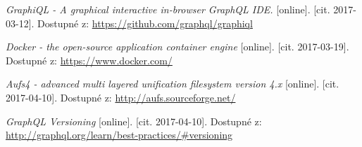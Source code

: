 \begin{thebibliography}{99}
\textit{GraphiQL - A graphical interactive in-browser GraphQL IDE.} [online]. [cit. 2017-03-12]. Dostupné z: \url{https://github.com/graphql/graphiql}

\textit{Docker - the open-source application container engine} [online]. [cit. 2017-03-19]. Dostupné z: \url{https://www.docker.com/}

\textit{Aufs4 - advanced multi layered unification filesystem version 4.x} [online]. [cit. 2017-04-10]. Dostupné z: \url{http://aufs.sourceforge.net/}

\textit{GraphQL Versioning} [online]. [cit. 2017-04-10]. Dostupné z: \url{http://graphql.org/learn/best-practices/#versioning}

\end{thebibliography}
